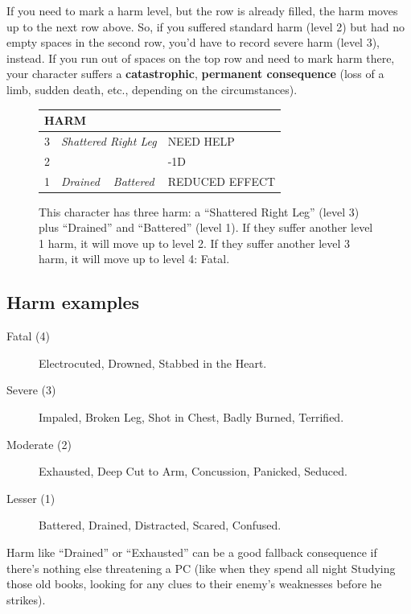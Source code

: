 If you need to mark a harm level, but the row is already filled, the harm moves up to the next row above. So, if you suffered standard harm (level 2) but had no empty spaces in the second row, you’d have to record severe harm (level 3), instead. If you run out of spaces on the top row and need to mark harm there, your character suffers a \textbf{catastrophic}, \textbf{permanent consequence} (loss of a limb, sudden death, etc., depending on the circumstances).

\begin{figure}[H]
\centering\begin{tabular}{|p{0.7cm}|p{3cm}|p{3cm}|m{1.5cm}|}
\hline
\multicolumn{4}{|l|}{\small HARM} \\
\hline
3 & \multicolumn{2}{|l|}{\emph{\Large Shattered Right Leg}} & {\small NEED HELP} \\
\hline
\rule{0pt}{13pt}\rule[-1em]{0pt}{9pt}2 & & & {\centering\small -1D} \\ 
\hline
1 & \emph{\centering\Large Drained} & \emph{\Large Battered} & {\centering\small REDUCED EFFECT} \\
\hline
\end{tabular}
\caption[Harm Table]%
  {This character has three harm: a ``Shattered Right Leg'' (level 3) plus ``Drained'' and ``Battered'' (level 1). If they suffer another level 1 harm, it will move up to level 2. If they suffer another level 3 harm, it will move up to level 4: Fatal.}
\label{harm_fig}
\end{figure}


\subsection{Harm examples}

\begin{description}
\item[Fatal (4)] Electrocuted, Drowned, Stabbed in the Heart.
\item[Severe (3)] Impaled, Broken Leg, Shot in Chest, Badly Burned, Terrified.
\item[Moderate (2)] Exhausted, Deep Cut to Arm, Concussion, Panicked, Seduced.
\item[Lesser (1)] Battered, Drained, Distracted, Scared, Confused.
\end{description}

Harm like ``Drained'' or ``Exhausted'' can be a good fallback consequence if there’s nothing else threatening a PC (like when they spend all night Studying those old books, looking for any clues to their enemy’s weaknesses before he strikes).

